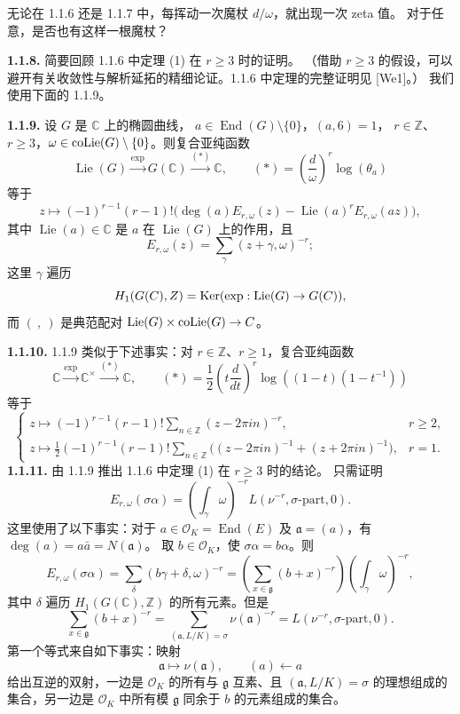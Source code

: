 无论在 1.1.6 还是 1.1.7 中，每挥动一次魔杖 $d/\omega$，就出现一次 zeta 值。
对于任意，是否也有这样一根魔杖？

\noindent\textbf{1.1.8.} 简要回顾 1.1.6 中定理 (1) 在 $r\geq3$ 时的证明。
（借助 $r\geq3$ 的假设，可以避开有关收敛性与解析延拓的精细论证。1.1.6 中定理的完整证明见 [We1]。）
我们使用下面的 1.1.9。

\noindent\textbf{1.1.9.} 设 $G$ 是 $\mathbb C$ 上的椭圆曲线，
$a\in\operatorname{End}(G)\setminus\{0\}$，$(a,6)=1$，
$r\in\mathbb Z$、$r\geq3$，$\omega\in\operatorname{coLie}(G)\setminus\{0\}$。则复合亚纯函数
\[
\operatorname{Lie}(G)\xrightarrow{\exp}G(\mathbb C)\xrightarrow{(*)}\mathbb C,
\qquad(*)=\left(\frac d\omega\right)^r\log(\theta_a)
\]
等于
\[
z\longmapsto(-1)^{r-1}(r-1)!
\bigl(\deg(a)E_{r,\omega}(z)-\operatorname{Lie}(a)^rE_{r,\omega}(az)\bigr),
\]
其中 $\operatorname{Lie}(a)\in\mathbb C$ 是 $a$ 在 $\operatorname{Lie}(G)$ 上的作用，且
\[
E_{r,\omega}(z)=\sum_\gamma(z+\gamma,\omega)^{-r};
\]
这里 $\gamma$ 遍历
\[
H_1(G(C),Z)=\operatorname{Ker}(\exp:\operatorname{Lie}(G)\to G(C)),
\]
而 $(\ ,\ )$ 是典范配对 $\operatorname{Lie}(G)\times\operatorname{coLie}(G)\to C$。

\noindent\textbf{1.1.10.} 1.1.9 类似于下述事实：对 $r\in\mathbb Z$、$r\geq1$，复合亚纯函数
\[
\mathbb C\xrightarrow{\exp}\mathbb C^\times\xrightarrow{(*)}\mathbb C,
\qquad(*)=\frac12\left(t\frac d{dt}\right)^r\log((1-t)(1-t^{-1}))
\]
等于
\[
\begin{cases}
z\longmapsto(-1)^{r-1}(r-1)!\displaystyle\sum_{n\in\mathbb Z}(z-2\pi in)^{-r},&r\geq2,\\[1ex]
z\longmapsto\frac12(-1)^{r-1}(r-1)!\displaystyle\sum_{n\in\mathbb Z}
\bigl((z-2\pi in)^{-1}+(z+2\pi in)^{-1}\bigr),&r=1.
\end{cases}
\]
\noindent\textbf{1.1.11.} 由 1.1.9 推出 1.1.6 中定理 (1) 在 $r\geq3$ 时的结论。
只需证明
\[
E_{r,\omega}(\sigma\alpha)=\left(\int_\gamma\omega\right)^{-r}
L(\nu^{-r},\sigma\text{-part},0).
\]
这里使用了以下事实：对于 $a\in\mathcal O_K=\operatorname{End}(E)$ 及
$\mathfrak a=(a)$，有 $\deg(a)=a\bar a=N(\mathfrak a)$。
取 $b\in\mathcal O_K$，使 $\sigma\alpha=b\alpha$。则
\[
E_{r,\omega}(\sigma\alpha)=\sum_\delta(b\gamma+\delta,\omega)^{-r}
=\left(\sum_{x\in\mathfrak g}(b+x)^{-r}\right)
\left(\int_\gamma\omega\right)^{-r},
\]
其中 $\delta$ 遍历 $H_1(G(\mathbb C),\mathbb Z)$ 的所有元素。但是
\[
\sum_{x\in\mathfrak g}(b+x)^{-r}
=\sum_{(\mathfrak a,L/K)=\sigma}\nu(\mathfrak a)^{-r}
=L(\nu^{-r},\sigma\text{-part},0).
\]
第一个等式来自如下事实：映射
\[
\mathfrak a\longmapsto\nu(\mathfrak a),\qquad(a)\longleftarrow a
\]
给出互逆的双射，一边是 $\mathcal O_K$ 的所有与 $\mathfrak g$ 互素、且
$(\mathfrak a,L/K)=\sigma$ 的理想组成的集合，另一边是 $\mathcal O_K$ 中所有模
$\mathfrak g$ 同余于 $b$ 的元素组成的集合。

